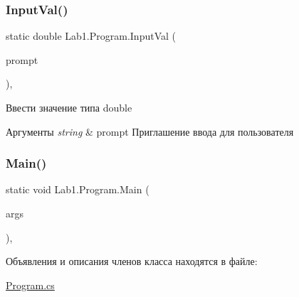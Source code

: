 \subsubsection{\texorpdfstring{Input\+Val()}{InputVal()}}
{\footnotesize\ttfamily static double Lab1.\+Program.\+Input\+Val (\begin{DoxyParamCaption}\item[{string}]{prompt }\end{DoxyParamCaption})\hspace{0.3cm}{\ttfamily [static]}, {\ttfamily [private]}}

Ввести значение типа double 
\begin{DoxyParams}{Аргументы}
{\em string} & prompt Приглашение ввода для пользователя \\
\hline
\end{DoxyParams}
\mbox{\label{class_lab1_1_1_program_ad4e0610aa096a9b9ab69f7fc7425799f}} 
\subsubsection{\texorpdfstring{Main()}{Main()}}
{\footnotesize\ttfamily static void Lab1.\+Program.\+Main (\begin{DoxyParamCaption}\item[{string \mbox{[}$\,$\mbox{]}}]{args }\end{DoxyParamCaption})\hspace{0.3cm}{\ttfamily [static]}, {\ttfamily [private]}}



Объявления и описания членов класса находятся в файле\+:\begin{DoxyCompactItemize}
\item 
\hyperlink{_program_8cs}{Program.\+cs}\end{DoxyCompactItemize}
